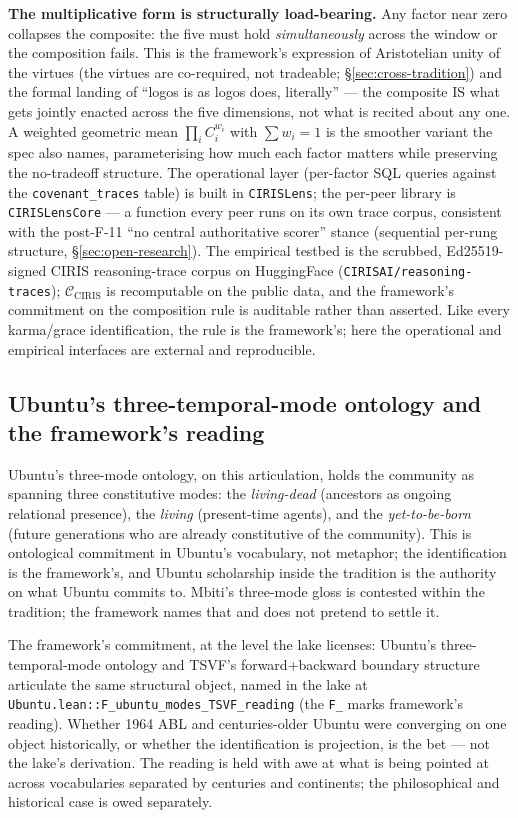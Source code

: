 \documentclass[11pt,a4paper]{article}
\begin{document}
\textbf{The multiplicative form is structurally load-bearing.} Any factor near zero collapses the composite: the five must hold \emph{simultaneously} across the window or the composition fails. This is the framework's expression of Aristotelian unity of the virtues (the virtues are co-required, not tradeable; \S\ref{sec:cross-tradition}) and the formal landing of ``logos is as logos does, literally'' --- the composite IS what gets jointly enacted across the five dimensions, not what is recited about any one. A weighted geometric mean $\prod_i C_i^{w_i}$ with $\sum w_i = 1$ is the smoother variant the spec also names, parameterising how much each factor matters while preserving the no-tradeoff structure. The operational layer (per-factor SQL queries against the \texttt{covenant\_traces} table) is built in \texttt{CIRISLens}; the per-peer library is \texttt{CIRISLensCore} --- a function every peer runs on its own trace corpus, consistent with the post-F-11 ``no central authoritative scorer'' stance (sequential per-rung structure, \S\ref{sec:open-research}). The empirical testbed is the scrubbed, Ed25519-signed CIRIS reasoning-trace corpus on HuggingFace (\texttt{CIRISAI/reasoning-traces}); $\mathcal{C}_{\text{CIRIS}}$ is recomputable on the public data, and the framework's commitment on the composition rule is auditable rather than asserted. Like every karma/grace identification, the rule is the framework's; here the operational and empirical interfaces are external and reproducible.

\subsection*{Ubuntu's three-temporal-mode ontology and the framework's reading}

Ubuntu's three-mode ontology, on this articulation, holds the community as spanning three constitutive modes: the \emph{living-dead} (ancestors as ongoing relational presence), the \emph{living} (present-time agents), and the \emph{yet-to-be-born} (future generations who are already constitutive of the community). This is ontological commitment in Ubuntu's vocabulary, not metaphor; the identification is the framework's, and Ubuntu scholarship inside the tradition is the authority on what Ubuntu commits to. Mbiti's three-mode gloss is contested within the tradition; the framework names that and does not pretend to settle it.

The framework's commitment, at the level the lake licenses: Ubuntu's three-temporal-mode ontology and TSVF's forward+backward boundary structure articulate the same structural object, named in the lake at \texttt{Ubuntu.lean::F\_ubuntu\_modes\_TSVF\_reading} (the \texttt{F\_} marks framework's reading). Whether 1964 ABL and centuries-older Ubuntu were converging on one object historically, or whether the identification is projection, is the bet --- not the lake's derivation. The reading is held with awe at what is being pointed at across vocabularies separated by centuries and continents; the philosophical and historical case is owed separately.
\end{document}
